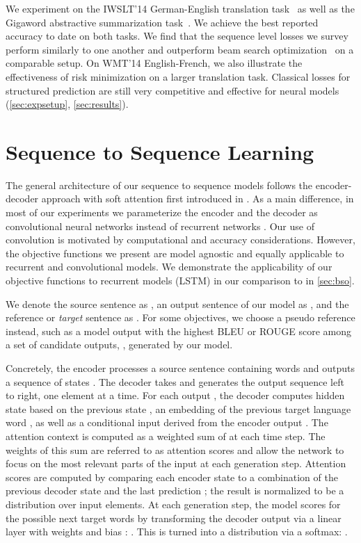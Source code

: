 \documentclass[11pt,a4paper]{article}
\begin{document}
We experiment on the IWSLT'14 German-English translation task~\citep{cettolo2014report} as well as the Gigaword abstractive summarization task~\citep{rush2015abs}.
We achieve the best reported accuracy to date on both tasks.
We find that the sequence level losses we survey perform similarly to one another and outperform beam search optimization~\citep{wiseman2016acl} on a comparable setup.
On WMT'14 English-French, we also illustrate the effectiveness of risk minimization on a larger translation task.
Classical losses for structured prediction are still very competitive and effective for neural models (\textsection\ref{sec:expsetup}, \textsection\ref{sec:results}).


\section{Sequence to Sequence Learning}
\label{sec:model}

The general architecture of our sequence to sequence models follows the encoder-decoder approach with soft attention first introduced in \cite{bahdanau2014neural}.
As a main difference, in most of our experiments we parameterize the encoder and the decoder as convolutional neural networks instead of recurrent networks \citep{gehring2016convolutional,gehring2017icml}. Our use of convolution is motivated by computational and accuracy considerations. However, the objective functions we present are model agnostic and equally applicable to recurrent and convolutional models. We demonstrate the applicability of our objective functions to recurrent models (LSTM) in our comparison to \citet{wiseman2016acl} in \textsection\ref{sec:bso}.

\smallskip
{} We denote the source sentence as , an output sentence of our model as , and the reference or \emph{target} sentence as .
For some objectives, we choose a pseudo reference  instead, such as a model output with the highest BLEU or ROUGE score among a set of candidate outputs, , generated by our model.

Concretely, the encoder processes a source sentence  containing  words and outputs a sequence of states .
The decoder takes  and generates the output sequence  left to right, one element at a time.
For each output , the decoder computes hidden state  based on the previous state , an embedding  of the previous target language word , as well as a conditional input  derived from the encoder output .
The attention context  is computed as a weighted sum of  at each time step.
The weights of this sum are referred to as attention scores and allow the network to focus 
on the most relevant parts of the input at each generation step.
Attention scores are computed by comparing each encoder state  to a combination of the previous decoder state  and the last prediction ;
the result is normalized to be a distribution over input elements.
At each generation step, the model scores for the  possible next target words  by transforming the decoder output  via a linear layer with weights  and bias : .
This is turned into a distribution via a softmax:
.
\end{document}
